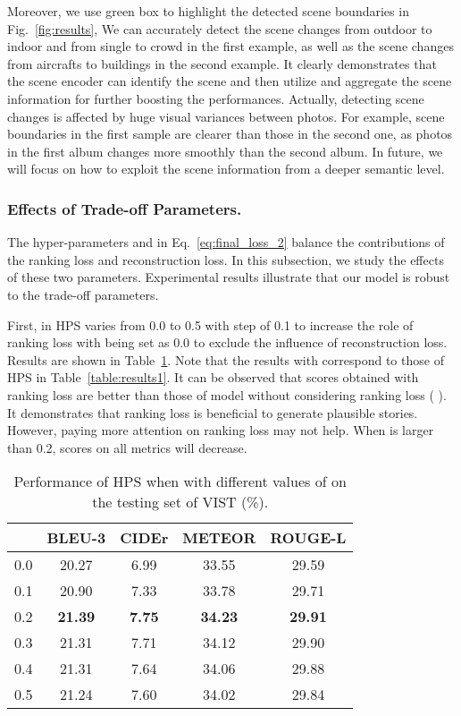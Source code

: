 \documentclass[letterpaper]{article} \usepackage{aaai19}  \usepackage{times}  \usepackage{helvet}  \usepackage{courier}  \usepackage{url}  \usepackage{graphicx}  \usepackage{color}
\begin{document}
Moreover, we use green box to highlight the detected scene boundaries in Fig.~\ref{fig:results}, We can accurately detect the scene changes from outdoor to indoor and from single to crowd in the first example, as well as the scene changes from aircrafts to buildings in the second example. It clearly demonstrates that the scene encoder can identify the scene and then utilize and aggregate the scene information for further boosting the performances.
Actually, detecting scene changes is affected by huge visual variances between photos. For example, scene boundaries in the first sample are clearer than those in the second one, as photos in the first album changes more smoothly than the second album. In future, we will focus on how to exploit the scene information from a deeper semantic level.


\subsubsection{Effects of Trade-off Parameters.}
The hyper-parameters  and  in Eq.~\eqref{eq:final_loss_2} balance the contributions of the  ranking loss and reconstruction loss. In this subsection, we study the effects of these two parameters. Experimental results illustrate that our model is robust to the trade-off parameters.


First,   in HPS varies from 0.0 to 0.5 with step of 0.1 to increase the role of ranking loss with  being set as 0.0 to exclude the influence of reconstruction loss.
Results are shown in Table~\ref{table:results_lambda}. Note that the results with   correspond to those of HPS in Table~\ref{table:results1}. It can be observed that scores obtained with ranking loss are better than those of model without considering ranking loss ( ). It demonstrates that ranking loss is beneficial to generate plausible stories. However, paying more attention on ranking loss may not help. When  is larger than 0.2, scores on all metrics will decrease.

\begin{table}[h]
\begin{center}
\caption{Performance of HPS when  with different values of  on the testing set of VIST (\%). }
\begin{adjustbox}{width=0.345\textwidth} \label{table:results_lambda}
\begin{tabular}{c|c|c|c|c}
\hline
    & BLEU-3 & CIDEr & METEOR  & ROUGE-L \\ \hline
0.0   &20.27 &6.99  & 33.55 & 29.59 \\
0.1  &20.90 &7.33 &33.78 &29.71 \\
0.2   &\textbf{21.39} &\textbf{7.75}  &\textbf{34.23}  &\textbf{29.91}  \\
0.3  &21.31 &7.71 &34.12 &29.90 \\
0.4   &21.31 &7.64 &34.06  &29.88  \\
0.5  &21.24 &7.60 &34.02 &29.84 \\
\hline
\end{tabular}
\end{adjustbox}
\end{center}
\end{table}
\end{document}

